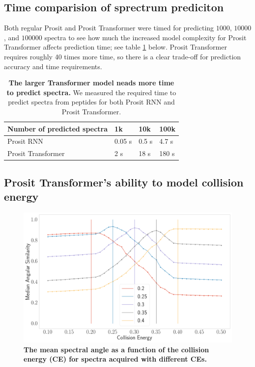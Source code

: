 \documentclass[10pt,a4paper]{article}
\begin{document}
\subsection*{Time comparision of sprectrum prediciton}

Both regular Prosit and Prosit Transformer were timed for predicting $1000$, $10000$, and $100000$ spectra to see how much the increased model complexity for Prosit Transformer affects prediction time; see table \ref{tab:predictionTime} below. Prosit Transformer requires roughly 40 times more time, so there is a clear trade-off for prediction accuracy and time requirements. 

\begin{table}[htbp]
    \caption{{\bf The larger Transformer model neads more time to predict spectra.} We measured the required time to predict spectra from peptides for both Prosit RNN and Prosit Transformer.}
      \begin{tabular}{l|lll}
      \hline
      Number of predicted spectra & 1k & 10k  & 100k \\
      \hline
      Prosit RNN & 0.05 s & 0.5 s  & 4.7 s \\
      Prosit Transformer & 2 s    & 18 s   & 180 s \\
      \hline
      \end{tabular}%
    \label{tab:predictionTime}%
  \end{table}%
  

\subsection*{Prosit Transformer’s ability to model collision energy}

\begin{figure}[ht!]
    \centering
    \includegraphics[width=12cm]{./img/ce_calibration.png}
    \caption{{\bf The mean spectral angle as a function of the collision energy (CE) for spectra acquired with different CEs.}\label{fig:ce}}
\end{figure}
    
\end{document}
